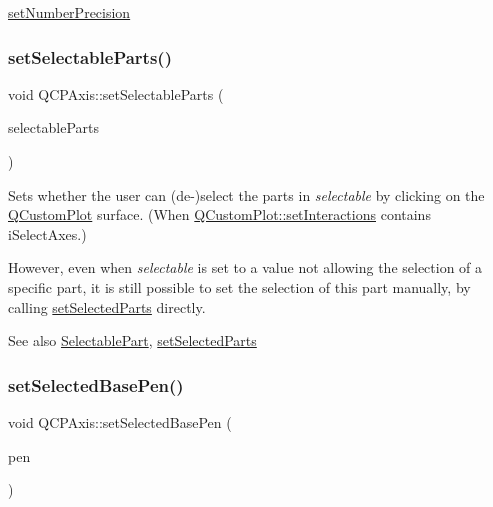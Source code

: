 \mbox{\hyperlink{class_q_c_p_axis_a21dc8023ad7500382ad9574b48137e63}{set\+Number\+Precision}} \mbox{\label{class_q_c_p_axis_a513f9b9e326c505d9bec54880031b085}} 
\subsubsection{\texorpdfstring{setSelectableParts()}{setSelectableParts()}}
{\footnotesize\ttfamily void Q\+C\+P\+Axis\+::set\+Selectable\+Parts (\begin{DoxyParamCaption}\item[{const Q\+C\+P\+Axis\+::\+Selectable\+Parts \&}]{selectable\+Parts }\end{DoxyParamCaption})}

Sets whether the user can (de-\/)select the parts in {\itshape selectable} by clicking on the \mbox{\hyperlink{class_q_custom_plot}{Q\+Custom\+Plot}} surface. (When \mbox{\hyperlink{class_q_custom_plot_a5ee1e2f6ae27419deca53e75907c27e5}{Q\+Custom\+Plot\+::set\+Interactions}} contains i\+Select\+Axes.)

However, even when {\itshape selectable} is set to a value not allowing the selection of a specific part, it is still possible to set the selection of this part manually, by calling \mbox{\hyperlink{class_q_c_p_axis_ab9d7a69277dcbed9119b3c1f25ca19c3}{set\+Selected\+Parts}} directly.

\begin{DoxySeeAlso}{See also}
\mbox{\hyperlink{class_q_c_p_axis_abee4c7a54c468b1385dfce2c898b115f}{Selectable\+Part}}, \mbox{\hyperlink{class_q_c_p_axis_ab9d7a69277dcbed9119b3c1f25ca19c3}{set\+Selected\+Parts}} 
\end{DoxySeeAlso}
\mbox{\label{class_q_c_p_axis_aeb917a909215605b95ef2be843de1ee8}} 
\subsubsection{\texorpdfstring{setSelectedBasePen()}{setSelectedBasePen()}}
{\footnotesize\ttfamily void Q\+C\+P\+Axis\+::set\+Selected\+Base\+Pen (\begin{DoxyParamCaption}\item[{const Q\+Pen \&}]{pen }\end{DoxyParamCaption})}

